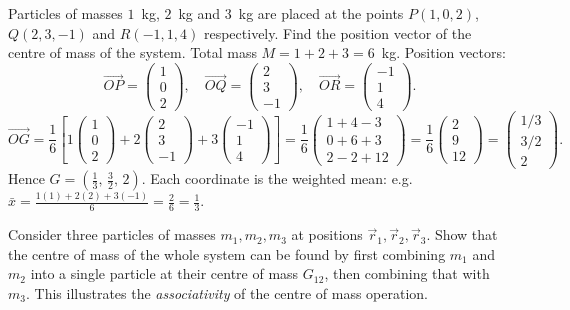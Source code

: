 \documentclass[11pt]{article}
\begin{document}
\begin{exoresolu}
Particles of masses $1$~kg, $2$~kg and $3$~kg are placed at the points $P(1,0,2)$, $Q(2,3,-1)$ and $R(-1,1,4)$ respectively. Find the position vector of the centre of mass of the system.
\tcblower
Total mass $M=1+2+3=6$~kg. Position vectors:
\[
\vec{OP}=\begin{pmatrix}1\\0\\2\end{pmatrix},\quad
\vec{OQ}=\begin{pmatrix}2\\3\\-1\end{pmatrix},\quad
\vec{OR}=\begin{pmatrix}-1\\1\\4\end{pmatrix}.
\]
\[
\vec{OG}=\frac{1}{6}\left[1\begin{pmatrix}1\\0\\2\end{pmatrix}+2\begin{pmatrix}2\\3\\-1\end{pmatrix}+3\begin{pmatrix}-1\\1\\4\end{pmatrix}\right]
=\frac{1}{6}\begin{pmatrix}1+4-3\\0+6+3\\2-2+12\end{pmatrix}
=\frac{1}{6}\begin{pmatrix}2\\9\\12\end{pmatrix}
=\begin{pmatrix}1/3\\3/2\\2\end{pmatrix}.
\]
Hence $G=\left(\tfrac13,\,\tfrac32,\,2\right)$. Each coordinate is the weighted mean: e.g. $\bar{x}=\frac{1(1)+2(2)+3(-1)}{6}=\frac{2}{6}=\frac13$.
\end{exoresolu}

\begin{experience}
Consider three particles of masses $m_1,m_2,m_3$ at positions $\vec{r}_1,\vec{r}_2,\vec{r}_3$. Show that the centre of mass of the whole system can be found by first combining $m_1$ and $m_2$ into a single particle at their centre of mass $G_{12}$, then combining that with $m_3$. This illustrates the \emph{associativity} of the centre of mass operation.
\end{experience}
\end{document}
